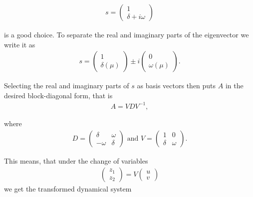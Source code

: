 \begin{solution}[4.4]
\begin{enumerate}
\begin{align}
s = \begin{pmatrix} 1  \\ \delta + i\omega \end{pmatrix}
\end{align}

is a good choice. To separate the real and imaginary parts of the eigenvector we write it as 
\begin{align}
s= \begin{pmatrix} 1\\ \delta(\mu) \end{pmatrix}\pm i \begin{pmatrix} 0 \\ \omega(\mu) \end{pmatrix}.
\end{align}

Selecting the real and imaginary parts of $s$ as basis vectors then puts $A$ in the desired block-diagonal form,  that is 
\begin{align}
A=VDV^{-1},
\end{align}

where 
\begin{align}
D=\begin{pmatrix} \delta & \omega \\ -\omega & \delta \end{pmatrix} \text{ and } V=\begin{pmatrix} 1 & 0 \\ \delta & \omega  \end{pmatrix}.
\end{align}

This means, that under  the change of variables 
\begin{align}
\begin{pmatrix} z_1 \\ z_2 \end{pmatrix} = V \begin{pmatrix} u \\ v\end{pmatrix}
\end{align}
 we get the transformed dynamical system
 

\end{enumerate}
\end{solution}
